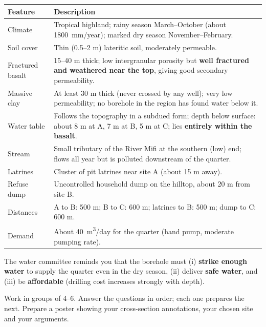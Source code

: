 \documentclass[11pt]{article}
\newcounter{popsec}
\newcounter{popsub}
\newcommand{\courssub}[1]{%
  \stepcounter{popsub}%
  \par\vspace{9pt}\noindent{\popxbold\fontsize{11.5}{13}\selectfont\color{popink}{\color{poporange}\thepopsec.\thepopsub}\hspace{6pt}#1}\par\nopagebreak\vspace{4pt}
}
\begin{document}
\begin{center}
\begin{tabularx}{\linewidth}{|l|X|}
\hline
\rowcolor{popblueL} \textbf{Feature} & \textbf{Description} \\
\hline
Climate & Tropical highland; rainy season March--October (about \SI{1800}{mm/year}); marked dry season November--February. \\
\hline
Soil cover & Thin (0.5--2 m) lateritic soil, moderately permeable. \\
\hline
Fractured basalt & 15--40 m thick; low intergranular porosity but \textbf{well fractured and weathered near the top}, giving good secondary permeability. \\
\hline
Massive clay & At least 30 m thick (never crossed by any well); very low permeability; no borehole in the region has found water below it. \\
\hline
Water table & Follows the topography in a subdued form; depth below surface: about 8 m at A, 7 m at B, 5 m at C; lies \textbf{entirely within the basalt}. \\
\hline
Stream & Small tributary of the River Mifi at the southern (low) end; flows all year but is polluted downstream of the quarter. \\
\hline
Latrines & Cluster of pit latrines near site A (about 15 m away). \\
\hline
Refuse dump & Uncontrolled household dump on the hilltop, about 20 m from site B. \\
\hline
Distances & A to B: 500 m; B to C: 600 m; latrines to B: 500 m; dump to C: 600 m. \\
\hline
Demand & About \SI{40}{m^3/day} for the quarter (hand pump, moderate pumping rate). \\
\hline
\end{tabularx}
\end{center}

The water committee reminds you that the borehole must (i) \textbf{strike enough water} to supply the quarter even in the dry season, (ii) deliver \textbf{safe water}, and (iii) be \textbf{affordable} (drilling cost increases strongly with depth).

\courssub{Tasks}

Work in groups of 4--6. Answer the questions in order; each one prepares the next. Prepare a poster showing your cross-section annotations, your chosen site and your arguments.
\end{document}
